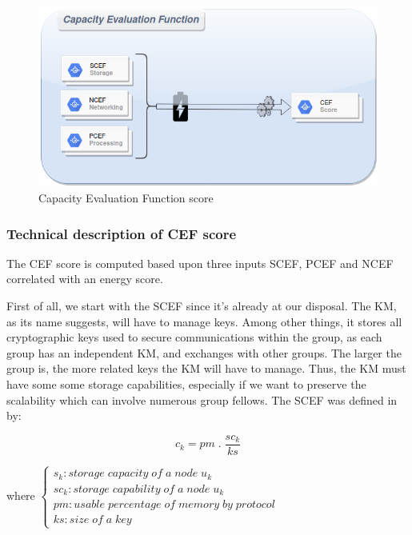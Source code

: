 \begin{figure}[htbp]
	\centerline{\includegraphics[scale=0.50]{figures/cef.png}}
	\caption{Capacity Evaluation Function score}
	\label{fig}
\end{figure}

\subsubsection{Technical description of CEF score}

The CEF score is computed based upon three inputs SCEF, PCEF and NCEF correlated with an energy score.

First of all, we start with the SCEF since it’s already at our disposal. The KM, as its name suggests, will have to manage keys. Among other things, it stores all cryptographic keys used to secure communications within the group, as each group has an independent KM, and exchanges with other groups. The larger the group is, the more related keys the KM will have to manage. Thus, the KM must have some some storage capabilities, especially if we want to preserve the scalability which can involve numerous group fellows. The SCEF was defined in \cite{kandi_versatile_2020} by:

\begin{equation}\label{eq1}
	c_k = pm \; .\; \frac{sc_k}{ks}
\end{equation}

where
\begin{math}
	\left\{
	\begin{array}{l}
		s_k: storage\; capacity\; of\; a\; node\; u_k\\
		sc_k: storage\; capability\; of\; a\; node\; u_k\\
		pm: usable\; percentage\; of\; memory\; by\; protocol\\
		ks: size\; of\; a\; key
	\end{array}
	\right.
\end{math}\\

